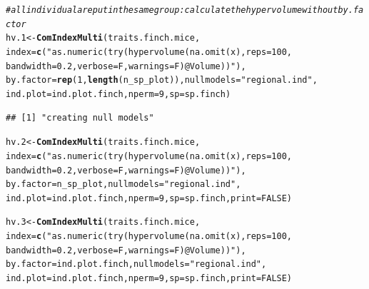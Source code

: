 \documentclass[12pt]{article}\usepackage[]{graphicx}\usepackage[]{color}
\makeatletter
\newcommand{\hlnum}[1]{\textcolor[rgb]{0.686,0.059,0.569}{#1}}%
\newcommand{\hlstr}[1]{\textcolor[rgb]{0.192,0.494,0.8}{#1}}%
\newcommand{\hlcom}[1]{\textcolor[rgb]{0.678,0.584,0.686}{\textit{#1}}}%
\newcommand{\hlstd}[1]{\textcolor[rgb]{0.345,0.345,0.345}{#1}}%
\newcommand{\hlkwb}[1]{\textcolor[rgb]{0.69,0.353,0.396}{#1}}%
\newcommand{\hlkwc}[1]{\textcolor[rgb]{0.333,0.667,0.333}{#1}}%
\newcommand{\hlkwd}[1]{\textcolor[rgb]{0.737,0.353,0.396}{\textbf{#1}}}%
\newenvironment{kframe}{%
 \def\at@end@of@kframe{}%
 \ifinner\ifhmode%
  \def\at@end@of@kframe{\end{minipage}}%
  \begin{minipage}{\columnwidth}%
 \fi\fi%
 \def\FrameCommand##1{\hskip\@totalleftmargin \hskip-\fboxsep
 \colorbox{shadecolor}{##1}\hskip-\fboxsep
     \hskip-\linewidth \hskip-\@totalleftmargin \hskip\columnwidth}%
 \MakeFramed {\advance\hsize-\width
   \@totalleftmargin\z@ \linewidth\hsize
   \@setminipage}}%
 {\par\unskip\endMakeFramed%
 \at@end@of@kframe}
\newenvironment{knitrout}{}{} %
\makeatother
\begin{document}
\begin{knitrout}
\color{fgcolor}\begin{kframe}
\begin{alltt}
\hlcom{#all individual are put in the same group: calculate the hypervolume without by.factor}
\hlstd{hv.1}\hlkwb{<-}\hlkwd{ComIndexMulti}\hlstd{(traits.finch.mice,}
             \hlkwc{index} \hlstd{=} \hlkwd{c}\hlstd{(}\hlstr{"as.numeric(try(hypervolume(na.omit(x), reps = 100, 
                 bandwidth = 0.2, verbose = F, warnings = F)@Volume))"}\hlstd{),}
             \hlkwc{by.factor} \hlstd{=} \hlkwd{rep}\hlstd{(}\hlnum{1}\hlstd{,}\hlkwd{length}\hlstd{(n_sp_plot)),} \hlkwc{nullmodels} \hlstd{=} \hlstr{"regional.ind"}\hlstd{,}
             \hlkwc{ind.plot} \hlstd{= ind.plot.finch,} \hlkwc{nperm} \hlstd{=} \hlnum{9}\hlstd{,} \hlkwc{sp} \hlstd{= sp.finch)}
\end{alltt}
\begin{verbatim}
## [1] "creating null models"
\end{verbatim}


{\ttfamily\noindent\bfseries\color{errorcolor}{\#\# Error: objet 's' introuvable}}\begin{alltt}
\hlstd{hv.2}\hlkwb{<-}\hlkwd{ComIndexMulti}\hlstd{(traits.finch.mice,}
             \hlkwc{index} \hlstd{=} \hlkwd{c}\hlstd{(}\hlstr{"as.numeric(try(hypervolume(na.omit(x), reps = 100, 
                 bandwidth = 0.2, verbose = F, warnings = F)@Volume))"}\hlstd{),}
             \hlkwc{by.factor} \hlstd{= n_sp_plot,} \hlkwc{nullmodels} \hlstd{=} \hlstr{"regional.ind"}\hlstd{,}
             \hlkwc{ind.plot} \hlstd{= ind.plot.finch,} \hlkwc{nperm} \hlstd{=} \hlnum{9}\hlstd{,} \hlkwc{sp} \hlstd{= sp.finch,} \hlkwc{print} \hlstd{=} \hlnum{FALSE}\hlstd{)}
\end{alltt}


{\ttfamily\noindent\bfseries\color{errorcolor}{\#\# Error: objet 's' introuvable}}\begin{alltt}
\hlstd{hv.3}\hlkwb{<-}\hlkwd{ComIndexMulti}\hlstd{(traits.finch.mice,}
             \hlkwc{index} \hlstd{=} \hlkwd{c}\hlstd{(}\hlstr{"as.numeric(try(hypervolume(na.omit(x), reps = 100,
                 bandwidth = 0.2, verbose = F, warnings = F)@Volume))"}\hlstd{),}
             \hlkwc{by.factor} \hlstd{= ind.plot.finch,} \hlkwc{nullmodels} \hlstd{=}\hlstr{"regional.ind"}\hlstd{,}
             \hlkwc{ind.plot} \hlstd{= ind.plot.finch,} \hlkwc{nperm} \hlstd{=} \hlnum{9}\hlstd{,} \hlkwc{sp} \hlstd{= sp.finch,} \hlkwc{print} \hlstd{=} \hlnum{FALSE}\hlstd{)}
\end{alltt}



\end{kframe}
\end{knitrout}
\end{document}

